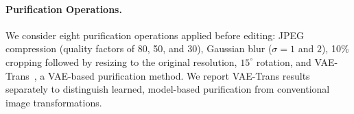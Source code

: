 \paragraph{Purification Operations.}
We consider eight purification operations applied before editing: JPEG compression (quality factors of 80, 50, and 30), Gaussian blur ($\sigma=1$ and $2$), 10\% cropping followed by resizing to the original resolution, $15^\circ$ rotation, and VAE-Trans~\cite{purifyonce2026}, a VAE-based purification method. We report VAE-Trans results separately to distinguish learned, model-based purification from conventional image transformations.





